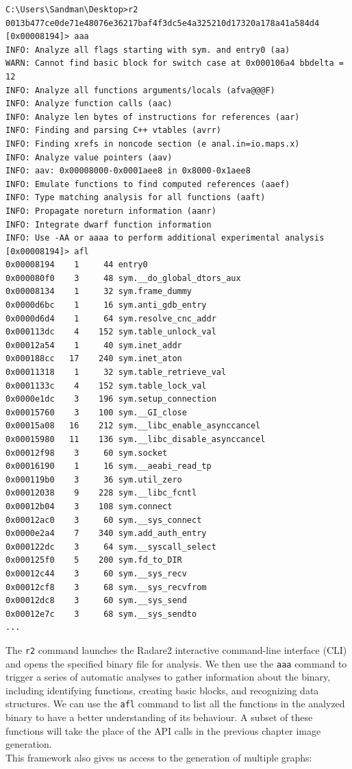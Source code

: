 \begin{center}
\begin{adjustbox}{width=0.94\linewidth,keepaspectratio}
\begin{lstlisting}[style=Radare2]
C:\Users\Sandman\Desktop>r2 0013b477ce0de71e48076e36217baf4f3dc5e4a325210d17320a178a41a584d4
[0x00008194]> aaa
INFO: Analyze all flags starting with sym. and entry0 (aa)
WARN: Cannot find basic block for switch case at 0x000106a4 bbdelta = 12
INFO: Analyze all functions arguments/locals (afva@@@F)
INFO: Analyze function calls (aac)
INFO: Analyze len bytes of instructions for references (aar)
INFO: Finding and parsing C++ vtables (avrr)
INFO: Finding xrefs in noncode section (e anal.in=io.maps.x)
INFO: Analyze value pointers (aav)
INFO: aav: 0x00008000-0x0001aee8 in 0x8000-0x1aee8
INFO: Emulate functions to find computed references (aaef)
INFO: Type matching analysis for all functions (aaft)
INFO: Propagate noreturn information (aanr)
INFO: Integrate dwarf function information
INFO: Use -AA or aaaa to perform additional experimental analysis
[0x00008194]> afl
0x00008194    1     44 entry0
0x000080f0    3     48 sym.__do_global_dtors_aux
0x00008134    1     32 sym.frame_dummy
0x0000d6bc    1     16 sym.anti_gdb_entry
0x0000d6d4    1     64 sym.resolve_cnc_addr
0x000113dc    4    152 sym.table_unlock_val
0x00012a54    1     40 sym.inet_addr
0x000188cc   17    240 sym.inet_aton
0x00011318    1     32 sym.table_retrieve_val
0x0001133c    4    152 sym.table_lock_val
0x0000e1dc    3    196 sym.setup_connection
0x00015760    3    100 sym.__GI_close
0x00015a08   16    212 sym.__libc_enable_asynccancel
0x00015980   11    136 sym.__libc_disable_asynccancel
0x00012f98    3     60 sym.socket
0x00016190    1     16 sym.__aeabi_read_tp
0x000119b0    3     36 sym.util_zero
0x00012038    9    228 sym.__libc_fcntl
0x00012b04    3    108 sym.connect
0x00012ac0    3     60 sym.__sys_connect
0x0000e2a4    7    340 sym.add_auth_entry
0x000122dc    3     64 sym.__syscall_select
0x000125f0    5    200 sym.fd_to_DIR
0x00012c44    3     60 sym.__sys_recv
0x00012cf8    3     68 sym.__sys_recvfrom
0x00012dc8    3     60 sym.__sys_send
0x00012e7c    3     68 sym.__sys_sendto
...
\end{lstlisting}
\end{adjustbox}
\end{center}

\noindent The \texttt{r2} command launches the Radare2 interactive command-line interface (CLI) and opens the specified binary file for analysis. We then use the \texttt{aaa} command to trigger a series of automatic analyses to gather information about the binary, including identifying functions, creating basic blocks, and recognizing data structures. We can use the \texttt{afl} command to list all the functions in the analyzed binary to have a better understanding of its behaviour. A subset of these functions will take the place of the API calls in the previous chapter image generation. \\
This framework also gives us access to the generation of multiple graphs: 

